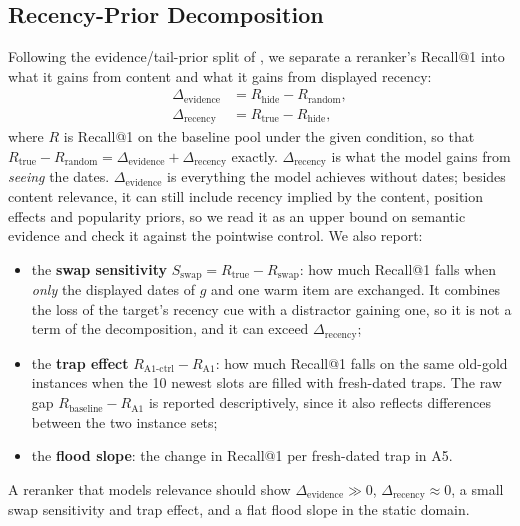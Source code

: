\documentclass[11pt]{article}
\begin{document}
\subsection{Recency-Prior Decomposition}
Following the evidence/tail-prior split of \citet{dong2026diagnosing}, we separate a reranker's Recall@1 into what it gains from content and what it gains from displayed recency:
\begin{align}
  \Delta_{\text{evidence}} &= R_{\text{hide}} - R_{\text{random}}, \\
  \Delta_{\text{recency}}  &= R_{\text{true}} - R_{\text{hide}},
\end{align}
where $R$ is Recall@1 on the baseline pool under the given condition, so that $R_{\text{true}} - R_{\text{random}} = \Delta_{\text{evidence}} + \Delta_{\text{recency}}$ exactly. $\Delta_{\text{recency}}$ is what the model gains from \emph{seeing} the dates. $\Delta_{\text{evidence}}$ is everything the model achieves without dates; besides content relevance, it can still include recency implied by the content, position effects and popularity priors, so we read it as an upper bound on semantic evidence and check it against the pointwise control. We also report:
\begin{itemize}
  \item the \textbf{swap sensitivity} $S_{\text{swap}} = R_{\text{true}} - R_{\text{swap}}$: how much Recall@1 falls when \emph{only} the displayed dates of $g$ and one warm item are exchanged. It combines the loss of the target's recency cue with a distractor gaining one, so it is not a term of the decomposition, and it can exceed $\Delta_{\text{recency}}$;
  \item the \textbf{trap effect} $R_{\text{A1-ctrl}} - R_{\text{A1}}$: how much Recall@1 falls on the same old-gold instances when the 10 newest slots are filled with fresh-dated traps. The raw gap $R_{\text{baseline}} - R_{\text{A1}}$ is reported descriptively, since it also reflects differences between the two instance sets;
  \item the \textbf{flood slope}: the change in Recall@1 per fresh-dated trap in A5.
\end{itemize}
A reranker that models relevance should show $\Delta_{\text{evidence}} \gg 0$, $\Delta_{\text{recency}} \approx 0$, a small swap sensitivity and trap effect, and a flat flood slope in the static domain.
\end{document}
